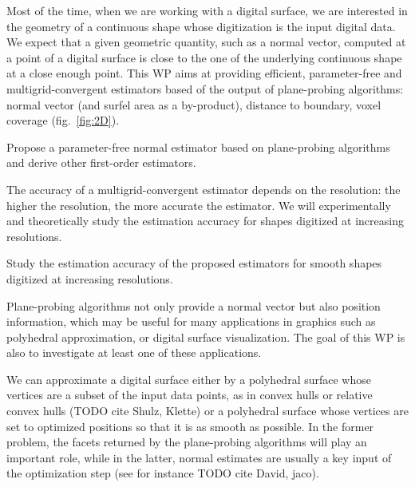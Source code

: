 
 Most of the time, when we are working with a digital surface, we are 
interested in the geometry of a continuous shape whose digitization is the input digital data.
We expect that a given geometric quantity, such as a normal vector, computed at a point of a digital surface
is close to the one of the underlying continuous shape at a close enough point. 
This WP aims at providing efficient, parameter-free and multigrid-convergent estimators based of
the output of plane-probing algorithms: normal vector (and surfel area as a by-product),
distance to boundary, voxel coverage (fig.~\ref{fig:2D}).

\begin{Task}
  \label{task:normal}
  Propose a parameter-free normal estimator based on plane-probing algorithms and
  derive other first-order estimators.  
\end{Task}

The accuracy of a multigrid-convergent estimator depends on the resolution: the higher the resolution,
the more accurate the estimator. We will experimentally and theoretically study the estimation accuracy
for shapes digitized at increasing resolutions. 

\begin{Task}
  \label{task:conv}
  Study the estimation accuracy of the proposed estimators for smooth shapes digitized at increasing resolutions. 
\end{Task}

Plane-probing algorithms not only provide a normal vector but also position information,
which may be useful for many applications in graphics such as polyhedral approximation,
 or digital surface visualization. The goal of this WP is also to investigate at least
one of these applications.   


We can approximate a digital surface either by a polyhedral surface whose vertices 
are a subset of the input data points, as in convex hulls or relative convex hulls (TODO cite Shulz, Klette)
or a polyhedral surface whose vertices are set to optimized positions so that it is
as smooth as possible. In the former problem, the facets returned by the
plane-probing algorithms will play an important role, while in the latter,
normal estimates are usually a key input of the optimization step (see for instance
TODO cite David, jaco).  

